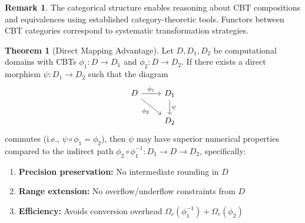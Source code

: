 \documentclass[11pt]{article}
\theoremstyle{definition}
\newtheorem{theorem}{Theorem}
\newtheorem{remark}{Remark}
\begin{document}
\begin{remark}
The categorical structure enables reasoning about CBT compositions and equivalences using established category-theoretic tools. Functors between CBT categories correspond to systematic transformation strategies.
\end{remark}

\begin{theorem}[Direct Mapping Advantage]
\label{thm:direct-mapping}
Let $D, D_1, D_2$ be computational domains with CBTs $\phi_1: D \to D_1$ and $\phi_2: D \to D_2$. If there exists a direct morphism $\psi: D_1 \to D_2$ such that the diagram
\[
\begin{tikzcd}
D \arrow[r, "\phi_1"] \arrow[dr, "\phi_2"'] & D_1 \arrow[d, "\psi"] \\
& D_2
\end{tikzcd}
\]
commutes (i.e., $\psi \circ \phi_1 = \phi_2$), then $\psi$ may have superior numerical properties compared to the indirect path $\phi_2 \circ \phi_1^{-1}: D_1 \to D \to D_2$, specifically:
\begin{enumerate}
\item \textbf{Precision preservation:} No intermediate rounding in $D$
\item \textbf{Range extension:} No overflow/underflow constraints from $D$
\item \textbf{Efficiency:} Avoids conversion overhead $\Omega_c(\phi_1^{-1}) + \Omega_c(\phi_2)$
\end{enumerate}
\end{theorem}
\end{document}
